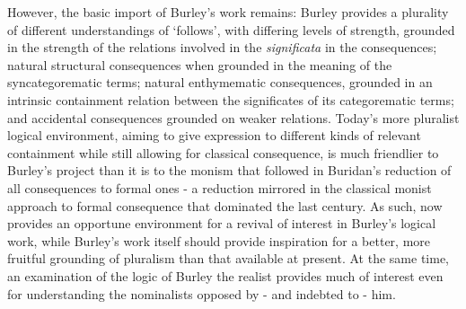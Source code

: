 \documentclass[]{article}
\begin{document}
However, the basic import of Burley's work remains: Burley provides a plurality of different understandings of `follows', with differing levels of strength, grounded in the strength of the relations involved in the \textit{significata} in the consequences; natural structural consequences when grounded in the meaning of the syncategorematic terms; natural enthymematic consequences, grounded in an intrinsic containment relation between the significates of its categorematic terms; and accidental consequences grounded on weaker relations. Today's more pluralist logical environment, aiming to give expression to different kinds of relevant containment while still allowing for classical consequence, is much friendlier to Burley's project than it is to the monism that followed in Buridan's reduction of all consequences to formal ones - a reduction mirrored in the classical monist approach to formal consequence that dominated the last century. As such, now provides an opportune environment for a revival of interest in Burley's logical work, while Burley's work itself should provide inspiration for a better, more fruitful grounding of pluralism than that available at present. At the same time, an examination of the logic of Burley the realist provides much of interest even for understanding the nominalists opposed by - and indebted to - him.
\printbibliography 
\end{document}
